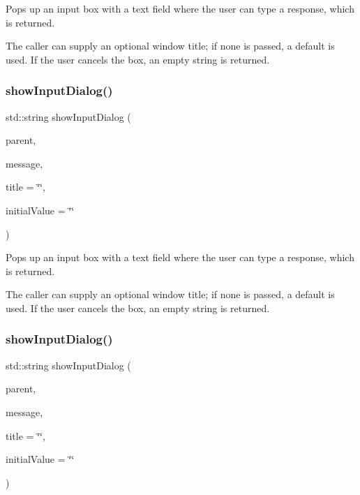 Pops up an input box with a text field where the user can type a response, which is returned. 

The caller can supply an optional window title; if none is passed, a default is used. If the user cancels the box, an empty string is returned. \mbox{\label{classGOptionPane_a035a6d874c9e81773e7c61305dbecabb}} 
\subsubsection{\texorpdfstring{show\+Input\+Dialog()}{showInputDialog()}\hspace{0.1cm}{\footnotesize\ttfamily [2/3]}}
{\footnotesize\ttfamily std\+::string show\+Input\+Dialog (\begin{DoxyParamCaption}\item[{\mbox{\hyperlink{classGWindow}{G\+Window}} $\ast$}]{parent,  }\item[{const std\+::string \&}]{message,  }\item[{const std\+::string \&}]{title = {\ttfamily \char`\"{}\char`\"{}},  }\item[{const std\+::string \&}]{initial\+Value = {\ttfamily \char`\"{}\char`\"{}} }\end{DoxyParamCaption})\hspace{0.3cm}{\ttfamily [static]}}



Pops up an input box with a text field where the user can type a response, which is returned. 

The caller can supply an optional window title; if none is passed, a default is used. If the user cancels the box, an empty string is returned. \mbox{\label{classGOptionPane_aabd3a04a3cdc998ee0e7e7e31676df17}} 
\subsubsection{\texorpdfstring{show\+Input\+Dialog()}{showInputDialog()}\hspace{0.1cm}{\footnotesize\ttfamily [3/3]}}
{\footnotesize\ttfamily std\+::string show\+Input\+Dialog (\begin{DoxyParamCaption}\item[{Q\+Widget $\ast$}]{parent,  }\item[{const std\+::string \&}]{message,  }\item[{const std\+::string \&}]{title = {\ttfamily \char`\"{}\char`\"{}},  }\item[{const std\+::string \&}]{initial\+Value = {\ttfamily \char`\"{}\char`\"{}} }\end{DoxyParamCaption})\hspace{0.3cm}{\ttfamily [static]}}



